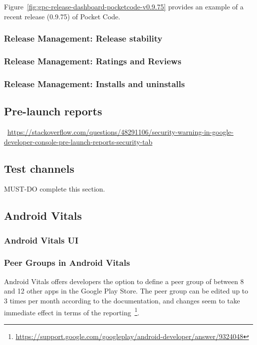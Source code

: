 Figure~\ref{fig:gpc-release-dashboard-pocketcode-v0.9.75} provides an example of a recent release (0.9.75) of Pocket Code.


\subsubsection{Release Management: Release stability}


\subsubsection{Release Management: Ratings and Reviews}


\subsubsection{Release Management: Installs and uninstalls}




\subsection{Pre-launch reports}

~\url{https://stackoverflow.com/questions/48291106/security-warning-in-google-developer-console-pre-launch-reports-security-tab}

\subsection{Test channels}\label{subsection-test-channels}
MUST-DO complete this section.

\subsection{Android Vitals}
\subsubsection{Android Vitals UI}

\subsubsection{Peer Groups in Android Vitals}\label{android-vitals-peer-groups}
Android Vitals offers developers the option to define a peer group of between 8 and 12 other apps in the Google Play Store. The peer group can be edited up to 3 times per month according to the documentation, and changes seem to take immediate effect in terms of the reporting~\footnote{\url{https://support.google.com/googleplay/android-developer/answer/9324048}}.


